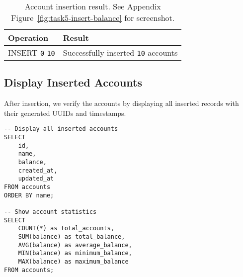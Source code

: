 \begin{table}[H]
  \centering
  \begin{tabular}{|l|l|}
    \hline
    \textbf{Operation} & \textbf{Result} \\
    \hline
    INSERT \texttt{0} \texttt{10} & Successfully inserted \texttt{10} accounts \\
    \hline
  \end{tabular}
  \caption{Account insertion result. See Appendix Figure~\ref{fig:task5-insert-balance} for screenshot.}
\end{table}

\subsection{Display Inserted Accounts}
After insertion, we verify the accounts by displaying all inserted records with their generated UUIDs and timestamps.

\begin{verbatim}
-- Display all inserted accounts
SELECT
    id,
    name,
    balance,
    created_at,
    updated_at
FROM accounts
ORDER BY name;

-- Show account statistics
SELECT
    COUNT(*) as total_accounts,
    SUM(balance) as total_balance,
    AVG(balance) as average_balance,
    MIN(balance) as minimum_balance,
    MAX(balance) as maximum_balance
FROM accounts;
\end{verbatim}

